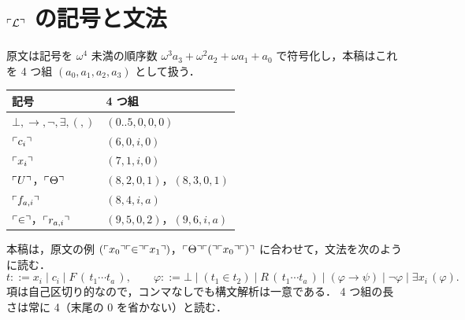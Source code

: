\section{$\ulcorner\mathcal{L}\urcorner$ の記号と文法}\label{app:code}
原文は記号を $\omega^4$ 未満の順序数 $\omega^3a_3+\omega^2a_2+\omega a_1+a_0$ で符号化し，本稿はこれを 4 つ組 $(a_0,a_1,a_2,a_3)$ として扱う．
\begin{center}\small
\begin{tabular}{ll}
\toprule
記号 & 4 つ組\\
\midrule
$\bot,\to,\neg,\exists,(,)$ & $(0..5,0,0,0)$\\
$\ulcorner c_i\urcorner$ & $(6,0,i,0)$\\
$\ulcorner x_i\urcorner$ & $(7,1,i,0)$\\
$\ulcorner U\urcorner$，$\ulcorner \Theta\urcorner$ & $(8,2,0,1)$，$(8,3,0,1)$\\
$\ulcorner f_{a,i}\urcorner$ & $(8,4,i,a)$\\
$\ulcorner \in\urcorner$，$\ulcorner r_{a,i}\urcorner$ & $(9,5,0,2)$，$(9,6,i,a)$\\
\bottomrule
\end{tabular}
\end{center}
本稿は，原文の例 $(\ulcorner x_0\urcorner\ulcorner \in\urcorner\ulcorner x_1\urcorner)$，$\ulcorner \Theta\urcorner\ulcorner (\urcorner\ulcorner x_0\urcorner\ulcorner )\urcorner$ に合わせて，文法を次のように読む．
\[ t ::= x_i\mid c_i\mid F\,(\,t_1\cdots t_a\,),\qquad \varphi ::= \bot\mid(t_1\in t_2)\mid R\,(\,t_1\cdots t_a\,)\mid(\varphi\to\psi)\mid\neg\varphi\mid\exists x_i\,(\varphi). \]
項は自己区切り的なので，コンマなしでも構文解析は一意である．
4 つ組の長さは常に 4（末尾の 0 を省かない）と読む．

